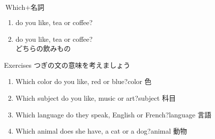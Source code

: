 \documentclass[aspectratio=169,xcolor={dvipsnames,table}]{beamer}
\begin{document}
\begin{frame}[plain]{$\text{Which} + \text{名詞}$}
\begin{enumerate}
 \item<1->  do you like, tea or coffee?
 \item<2->  do you like, tea or coffee?\\ {\small どちらの飲みもの}
\end{enumerate}

\mbox{}\hfill{\scriptsize {}}

\end{frame}


\begin{frame}[plain]{Exercises}
つぎの文の意味を考えましょう
\begin{enumerate}
 \item Which color do you like, red or blue?\hfill{\scriptsize color  色}
 \item Which subject  do you like, music or art?\hfill{\scriptsize subject   科目}
 \item Which language do they speak, English or French?\hfill{\scriptsize language   言語}
 \item Which animal does she have, a cat or a dog?\hfill{\scriptsize animal   動物}
\end{enumerate} 


\mbox{}\hfill{\scriptsize {}}

\end{frame}
\end{document}
